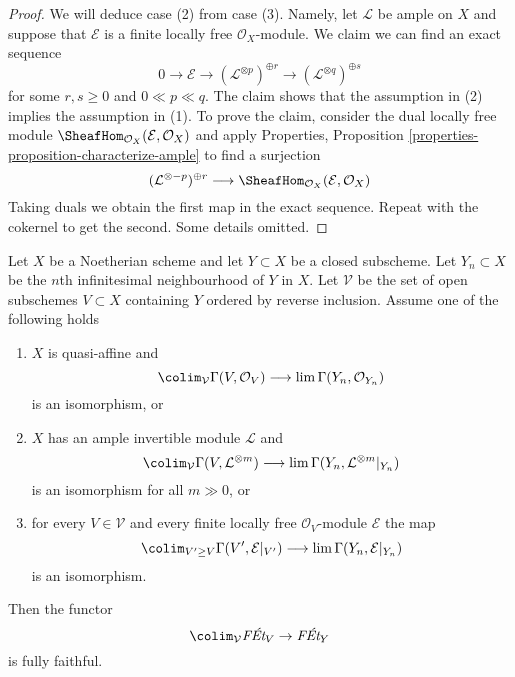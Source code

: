 \begin{proof}
\medskip\noindent
We will deduce case (2) from case (3). Namely, let $\mathcal{L}$ be ample
on $X$ and suppose that $\mathcal{E}$ is a
finite locally free $\mathcal{O}_X$-module.
We claim we can find an exact sequence
$$
0 \to \mathcal{E} \to
(\mathcal{L}^{\otimes p})^{\oplus r} \to
(\mathcal{L}^{\otimes q})^{\oplus s}
$$
for some $r, s \geq 0$ and $0 \ll p \ll q$.
The claim shows that the assumption in (2) implies the assumption in (1).
To prove the claim, consider the dual locally free module
$\SheafHom_{\mathcal{O}_X}(\mathcal{E}, \mathcal{O}_X)$
and apply
Properties, Proposition \ref{properties-proposition-characterize-ample}
to find a surjection
$$
(\mathcal{L}^{\otimes -p})^{\oplus r} \longrightarrow
\SheafHom_{\mathcal{O}_X}(\mathcal{E}, \mathcal{O}_X)
$$
Taking duals we obtain the first map in the exact sequence.
Repeat with the cokernel to get the second. Some details omitted.
\end{proof}

\begin{lemma}
\label{lemma-restriction-fully-faithful-general}
Let $X$ be a Noetherian scheme and let $Y \subset X$ be a closed subscheme.
Let $Y_n \subset X$ be the $n$th infinitesimal neighbourhood of $Y$ in $X$.
Let $\mathcal{V}$ be the set of open subschemes $V \subset X$ containing $Y$
ordered by reverse inclusion. Assume one of the following holds
\begin{enumerate}
\item $X$ is quasi-affine and
$$
\colim_\mathcal{V} \Gamma(V, \mathcal{O}_V)
\longrightarrow
\lim \Gamma(Y_n, \mathcal{O}_{Y_n})
$$
is an isomorphism, or
\item $X$ has an ample invertible module $\mathcal{L}$ and
$$
\colim_\mathcal{V} \Gamma(V, \mathcal{L}^{\otimes m})
\longrightarrow
\lim \Gamma(Y_n, \mathcal{L}^{\otimes m}|_{Y_n})
$$
is an isomorphism for all $m \gg 0$, or
\item for every $V \in \mathcal{V}$ and every finite locally free
$\mathcal{O}_V$-module $\mathcal{E}$ the map
$$
\colim_{V' \geq V} \Gamma(V', \mathcal{E}|_{V'})
\longrightarrow
\lim \Gamma(Y_n, \mathcal{E}|_{Y_n})
$$
is an isomorphism.
\end{enumerate}
Then the functor
$$
\colim_\mathcal{V} \textit{F\'Et}_V \to \textit{F\'Et}_Y
$$
is fully faithful.
\end{lemma}


